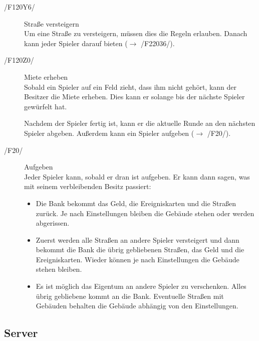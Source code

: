 \documentclass[a4paper,10pt]{article}
\begin{document}
\begin{description}
\item[/F120Y6/] Straße versteigern \\
Um eine Straße zu versteigern, müssen dies die Regeln erlauben. Danach kann jeder Spieler darauf bieten ($\rightarrow$ /F22036/).
\item[/F120Z0/] Miete erheben \\
Sobald ein Spieler auf ein Feld zieht, dass ihm nicht gehört, kann der Besitzer die Miete erheben. Dies kann er solange bis der nächste Spieler gewürfelt hat.

Nachdem der Spieler fertig ist, kann er die aktuelle Runde an den nächsten Spieler abgeben. Außerdem kann ein Spieler aufgeben ($\rightarrow$ /F20/).
\item[/F20/] Aufgeben \\
Jeder Spieler kann, sobald er dran ist aufgeben. Er kann dann sagen, was mit seinem verbleibenden Besitz passiert:
\begin{itemize}
\item Die Bank bekommt das Geld, die Ereigniskarten und die Straßen zurück. Je nach Einstellungen bleiben die Gebäude stehen oder werden abgerissen.
\item Zuerst werden alle Straßen an andere Spieler versteigert und dann bekommt die Bank die übrig gebliebenen Straßen, das Geld und die Ereigniskarten. Wieder können je nach Einstellungen die Gebäude stehen bleiben.
\item Es ist möglich das Eigentum an andere Spieler zu verschenken. Alles übrig gebliebene kommt an die Bank. Eventuelle Straßen mit Gebäuden behalten die Gebäude abhängig von den Einstellungen.
\end{itemize}
\end{description}

\subsection{Server}
\end{document}
